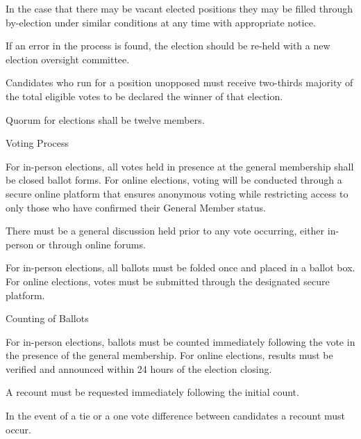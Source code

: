 \documentclass[12pt,a4paper]{article}
\begin{document}
\begin{constitutionlist}
\begin{constitutionlist}
\item In the case that there may be vacant elected positions they may be filled through by-election under similar conditions at any time with appropriate notice.

\item If an error in the process is found, the election should be re-held with a new election oversight committee.

\item Candidates who run for a position unopposed must receive two-thirds majority of the total eligible votes to be declared the winner of that election.

\item Quorum for elections shall be twelve members.
\end{constitutionlist}

\item Voting Process

\begin{constitutionlist}
\item For in-person elections, all votes held in presence at the general membership shall be closed ballot forms. For online elections, voting will be conducted through a secure online platform that ensures anonymous voting while restricting access to only those who have confirmed their General Member status.

\item There must be a general discussion held prior to any vote occurring, either in-person or through online forums.

\item For in-person elections, all ballots must be folded once and placed in a ballot box. For online elections, votes must be submitted through the designated secure platform.

\item Counting of Ballots

\begin{constitutionlist}
\item For in-person elections, ballots must be counted immediately following the vote in the presence of the general membership. For online elections, results must be verified and announced within 24 hours of the election closing.

\item A recount must be requested immediately following the initial count.

\item In the event of a tie or a one vote difference between candidates a recount must occur.


\end{constitutionlist}
\end{constitutionlist}
\end{constitutionlist}
\end{document}
